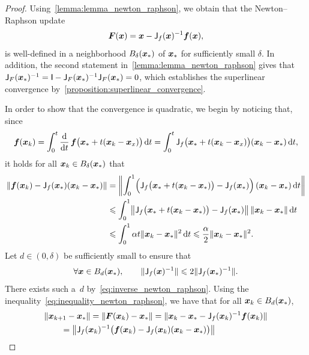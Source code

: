 \begin{proof}
    Using~\cref{lemma:lemma_newton_raphson},
    we obtain that the Newton--Raphson update
    \[
        \mathbf{\boldsymbol{F}}(\mathbf{\boldsymbol{x}}) = \mathbf{\boldsymbol{x}} - \mathsf J_{f}(\mathbf{\boldsymbol{x}})^{-1} \mathbf{\boldsymbol{f}}(\mathbf{\boldsymbol{x}}),
    \]
    is well-defined in a neighborhood $B_{\delta}(\mathbf{\boldsymbol{x}}_*)$ of $\mathbf{\boldsymbol{x}}_*$
    for sufficiently small $\delta$.
    In addition, the second statement in~\cref{lemma:lemma_newton_raphson} gives that $\mathsf J_F(\mathbf{\boldsymbol{x}}_*)^{-1} = \mathsf I - \mathsf J_F(\mathbf{\boldsymbol{x}}_*)^{-1} \mathsf J_F(\mathbf{\boldsymbol{x}}_*) = 0$,
    which establishes the superlinear convergence by~\cref{proposition:superlinear_convergence}.

    In order to show that the convergence is quadratic,
    we begin by noticing that,
    since
    \[
        \mathbf{\boldsymbol{f}}(\mathbf{\boldsymbol{x}}_k)
        = \int_{0}^{t} \frac{\mathrm d}{\mathrm d t} \, \mathbf{\boldsymbol{f}}\bigl(\mathbf{\boldsymbol{x}}_* + t(\mathbf{\boldsymbol{x}}_k - \mathbf{\boldsymbol{x}}_x) \bigr) \, \mathrm d t
        = \int_{0}^{t} \mathsf J_f\bigl(\mathbf{\boldsymbol{x}}_* + t(\mathbf{\boldsymbol{x}}_k - \mathbf{\boldsymbol{x}}_x) \bigr) (\mathbf{\boldsymbol{x}}_k - \mathbf{\boldsymbol{x}}_*) \, \mathrm d t,
    \]
    it holds for all $\mathbf{\boldsymbol{x}}_k \in B_{\delta}(\mathbf{\boldsymbol{x}}_*)$ that
    \begin{align}
        \notag
        \norm{\vect f(\vect x_k) - \mat J_f(\vect x_*) (\vect x_k - \vect x_*)}
        &= \norm*{\int_{0}^{1} \Bigl( \mat J_f\bigl(\vect x_* + t(\vect x_k - \vect x_*)\bigr) - \mat J_f(\vect x_*) \Bigr)  \, (\vect x_k - \vect x_*) \, \d t} \\
        \notag
        &\leq \int_{0}^{1} \norm*{\mat J_f\bigl(\vect x_* + t(\vect x_k - \vect x_*)\bigr) - \mat J_f(\vect x_*) }  \, \norm {\vect x_k - \vect x_*} \, \d t \\
        \label{eq:inequality_newton_raphson}
        &\leq \int_{0}^{1} \alpha t \norm {\vect x_k - \vect x_*}^2 \, \d t
        \leq \frac{\alpha}{2} \norm{\vect x_k - \vect x_*}^2.
    \end{align}
    Let $d \in (0, \delta)$ be sufficiently small to ensure that
    \[
        \forall \mathbf{\boldsymbol{x}} \in B_{d}(\mathbf{\boldsymbol{x}}_*),
        \qquad \lVert\mathsf J_f(\mathbf{\boldsymbol{x}})^{-1}\rVert \leqslant 2 \lVert\mathsf J_f(\mathbf{\boldsymbol{x}}_*)^{-1}\rVert.
    \]
    There exists such a~$d$ by~\eqref{eq:inverse_newton_raphson}.
    Using the inequality~\eqref{eq:inequality_newton_raphson},
    we have that for all $\mathbf{\boldsymbol{x}}_k \in B_{d}(\mathbf{\boldsymbol{x}}_*)$,
    \begin{align*}
        &\norm{\vect x_{k+1} - \vect x_*}
        = \norm{\vect F(\vect x_{k}) - \vect x_*}
        = \norm{\vect x_k - \vect x_* - \mat J_f(\vect x_k)^{-1} \vect f(\vect x_k)} \\
        &\qquad = \norm*{\mat J_f(\vect x_k)^{-1} \bigl(\vect f(\vect x_k) - \mat J_f(\vect x_k) (\vect x_k - \vect x_*) \bigr) }

\end{align*}
\end{proof}
